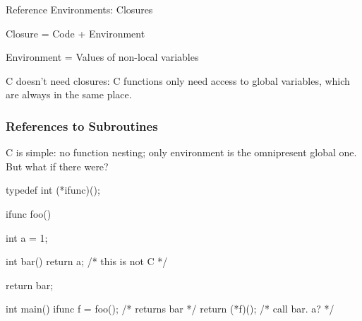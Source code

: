 \documentclass{plt}
\begin{document}
\begin{frame}{Reference Environments: Closures}

Closure = Code + Environment

Environment = Values of non-local variables

C doesn't need closures: C functions only need access to global
variables, which are always in the same place.

\end{frame}

\begin{frame}
  \frametitle{References to Subroutines}

C is simple: no function nesting; only environment is the omnipresent
global one.  But what if there were?

\begin{C}
typedef int (*ifunc)();

ifunc foo() {
  int a = 1;

  int bar() { return a; } /* this is not C */

  return bar;
}

int main() {
  ifunc f = foo();  /* returns bar */
  return (*f)();    /* call bar. a? */
}
\end{C}

\end{frame}

\fi
\end{document}
